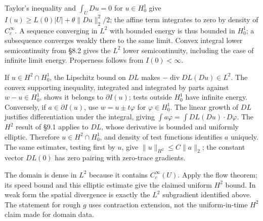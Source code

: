 \begin{expandedproof}
Taylor's inequality and $\int_U Du=0$ for $u\in H^1_0$ give
$I(u)\geq L(0)|U|+\theta\|Du\|_2^2/2$; the affine term integrates
to zero by density of $C_c^\infty$. A sequence converging in $L^2$ with
bounded energy is thus bounded in $H^1_0$; a subsequence converges weakly
there to the same limit. Convex integral lower semicontinuity from
\S8.2 gives the $L^2$ lower semicontinuity, including the case of infinite
limit energy. Properness follows from $I(0)<\infty$.

If $u\in H^2\cap H^1_0$, the Lipschitz bound on $DL$ makes
$-\operatorname{div}DL(Du)\in L^2$. The convex supporting inequality,
integrated and integrated by parts against $w-u\in H^1_0$, shows it
belongs to $\partial I(u)$; tests outside $H^1_0$ have infinite energy.
Conversely, if $a\in\partial I(u)$, use $w=u\pm t\varphi$ for
$\varphi\in H^1_0$. The linear growth of $DL$ justifies differentiation
under the integral, giving
$\int a\varphi=\int DL(Du)\cdot D\varphi$.
The $H^2$ result of \S9.1 applies to $DL$, whose derivative is bounded
and uniformly elliptic. Therefore $u\in H^2\cap H^1_0$, and density of
test functions identifies $a$ uniquely. The same estimates, testing
first by $u$, give $\|u\|_{H^2}\leq C\|a\|_2$; the constant vector
$DL(0)$ has zero pairing with zero-trace gradients.

The domain is dense in $L^2$ because it contains $C_c^\infty(U)$.
Apply the flow theorem; its speed bound and this elliptic estimate give
the claimed uniform $H^2$ bound. In weak form the spatial divergence
is exactly the $L^2$ subgradient identified above. The statement for
rough $g$ uses contraction extension, not the uniform-in-time $H^2$
claim made for domain data.
\end{expandedproof}
\Needspace{42mm}
